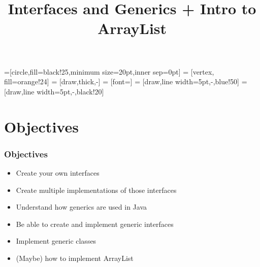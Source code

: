 \documentclass{beamer}
\title{\textbf{Interfaces and Generics + Intro to ArrayList}}
\date{\textbf{}}
\begin{document}

=[circle,fill=black!25,minimum size=20pt,inner sep=0pt]
 = [vertex, fill=orange!24]
 = [draw,thick,-]
 = [font=\small]
 = [draw,line width=5pt,-,blue!50]
 = [draw,line width=5pt,-,black!20]


\frame{\titlepage}

\section{Objectives}
\begin{frame}
    \frametitle{Objectives}
    \centering
    \begin{itemize}
        \item Create your own interfaces
        \item Create multiple implementations of those interfaces
        \item Understand how generics are used in Java
        \item Be able to create and implement generic interfaces
        \item Implement generic classes
        \item (Maybe) how to implement ArrayList
    \end{itemize}
\end{frame}
\end{document}
